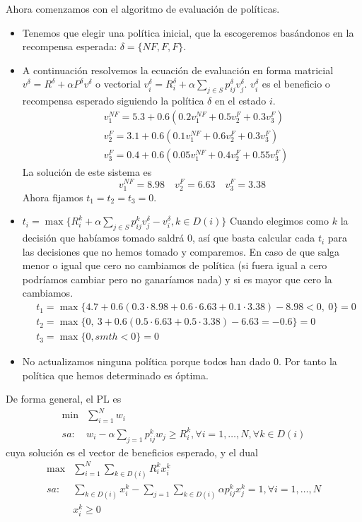 \documentclass[twoside]{article}
\begin{document}
\begin{ejercicio}{2}
\begin{solucion}
Ahora comenzamos con el algoritmo de evaluación de políticas. 
\begin{itemize}
\item Tenemos que elegir una política inicial, que la escogeremos basándonos en la recompensa esperada: $\delta=\{NF, F, F\}$.
\item  A continuación resolvemos la ecuación de evaluación en forma matricial $v^\delta=R^\delta+\alpha P^\delta v^\delta$ o vectorial $v^\delta_i=R^\delta_i+\alpha\sum_{j\in S}p_{ij}^\delta v_j^\delta$. $v_i^{\delta}$ es el beneficio o recompensa esperado siguiendo la política $\delta$ en el estado $i$.
\begin{align*}
&v^{NF}_1=5.3+0.6(0.2v_1^{NF}+0.5v_2^{F}+0.3v^F_3)\\
&v_2^F=3.1+0.6(0.1v_1^{NF}+0.6v_2^F+0.3v_3^F)\\
&v_3^F=0.4+0.6(0.05v_1^{NF}+0.4v_2^F+0.55v_3^F)
\end{align*}
La solución de este sistema es
\[
v_1^{NF}=8.98\quad v_2^F=6.63\quad v_3^F=3.38
\]
Ahora fijamos $t_1=t_2=t_3=0$.
\item $t_i=\max\{R_i^k+\alpha\sum_{j\in S}p_{ij}^kv_j^\delta-v_i^\delta, k\in D(i)\}$
Cuando elegimos como $k$ la decisión que habíamos tomado saldrá 0, así que basta calcular cada $t_i$ para las decisiones que no hemos tomado y comparemos. En caso de que salga menor o igual que cero no cambiamos de política (si fuera igual a cero podríamos cambiar pero no ganaríamos nada) y si es mayor que cero la cambiamos.
\begin{align*}
&t_1=\max\{4.7+0.6(0.3\cdot 8.98+0.6\cdot 6.63+0.1\cdot 3.38)-8.98<0,\ 0\}=0 \\
&t_2=\max\{0,\ 3+0.6(0.5\cdot 6.63+0.5\cdot 3.38)-6.63=-0.6\}=0\\
&t_3=\max\{0, smth<0\}=0
\end{align*}
\item No actualizamos ninguna política porque todos han dado 0. Por tanto la política que hemos determinado es óptima.
\end{itemize}

De forma general, el PL es
\begin{align*}
\min & \sum_{i=1}^N w_i\\
sa:  & w_i-\alpha\sum_{j=1}p_{ij}^kw_j\geq R_i^k, \forall i=1,\dots, N,\forall k\in D(i)
\end{align*}
cuya solución es el vector de beneficios esperado, y el dual
\begin{align*}
\max & \sum_{i=1}^N\sum_{k\in D(i)}R^k_ix_i^k\\
sa: & \sum_{k\in D(i)}x_i^k-\sum_{j=1}\sum_{k\in D(i)}\alpha p_{ij}^kx_j^k=1, \forall i=1,\dots, N\\
    & x^k_i\geq 0
\end{align*}


\end{solucion}
\end{ejercicio}
\end{document}
